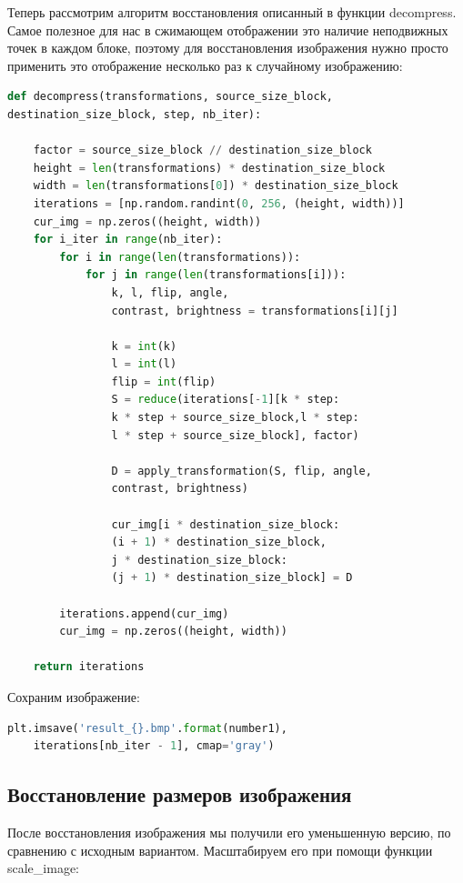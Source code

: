 \documentclass{article}
\begin{document}
Теперь рассмотрим алгоритм восстановления описанный в функции decompress. Самое полезное для нас в сжимающем отображении это наличие неподвижных точек в каждом блоке, поэтому для восстановления изображения 
нужно просто применить это отображение несколько раз к случайному изображению:

\begin{lstlisting}[language=Python]
def decompress(transformations, source_size_block, 
destination_size_block, step, nb_iter):

	factor = source_size_block // destination_size_block
	height = len(transformations) * destination_size_block
	width = len(transformations[0]) * destination_size_block
	iterations = [np.random.randint(0, 256, (height, width))]
	cur_img = np.zeros((height, width))
	for i_iter in range(nb_iter):
		for i in range(len(transformations)):
			for j in range(len(transformations[i])):
				k, l, flip, angle, 
				contrast, brightness = transformations[i][j]
				
				k = int(k)
				l = int(l)
				flip = int(flip)
				S = reduce(iterations[-1][k * step:
				k * step + source_size_block,l * step:
				l * step + source_size_block], factor)
				
				D = apply_transformation(S, flip, angle, 
				contrast, brightness)
				
				cur_img[i * destination_size_block:
				(i + 1) * destination_size_block,
				j * destination_size_block:
				(j + 1) * destination_size_block] = D
				
		iterations.append(cur_img)
		cur_img = np.zeros((height, width))

	return iterations
\end{lstlisting}
\vspace{1em}

Сохраним изображение:
\vspace{1em}

\begin{lstlisting}[language=Python]
	plt.imsave('result_{}.bmp'.format(number1), 
	iterations[nb_iter - 1], cmap='gray')
\end{lstlisting}
\vspace{1em}
\subsection{Восстановление размеров изображения}

После восстановления изображения мы получили его уменьшенную версию, по сравнению с исходным вариантом. Масштабируем его при помощи функции scale\_image:
\end{document}
